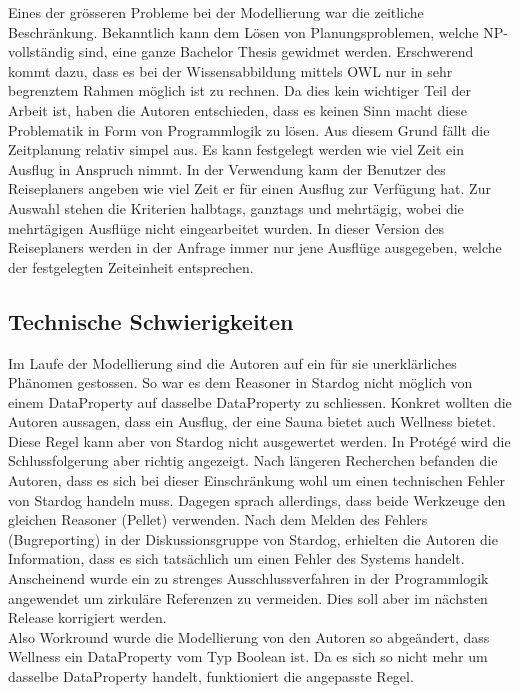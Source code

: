 Eines der grösseren Probleme bei der Modellierung war die zeitliche Beschränkung. Bekanntlich kann dem Lösen von Planungsproblemen, welche NP-vollständig sind, eine ganze Bachelor Thesis gewidmet werden. Erschwerend kommt dazu, dass es bei der Wissensabbildung mittels OWL nur in sehr begrenztem Rahmen möglich ist zu rechnen. Da dies kein wichtiger Teil der Arbeit ist, haben die Autoren entschieden, dass es keinen Sinn macht diese Problematik in Form von Programmlogik zu lösen. Aus diesem Grund fällt die Zeitplanung relativ simpel aus. Es kann festgelegt werden wie viel Zeit ein Ausflug in Anspruch nimmt. In der Verwendung kann der Benutzer des Reiseplaners angeben wie viel Zeit er für einen Ausflug zur Verfügung hat. Zur Auswahl stehen die Kriterien halbtags, ganztags und mehrtägig, wobei die mehrtägigen Ausflüge nicht eingearbeitet wurden. In dieser Version des Reiseplaners werden in der Anfrage immer nur jene Ausflüge ausgegeben, welche der festgelegten Zeiteinheit entsprechen.

\subsection{Technische Schwierigkeiten}
\label{subsec:loesung_modellierung_technischeSchwierigkeiten}
Im Laufe der Modellierung sind die Autoren auf ein für sie unerklärliches Phänomen gestossen. So war es dem Reasoner in Stardog nicht möglich von einem DataProperty auf dasselbe DataProperty zu schliessen. Konkret wollten die Autoren aussagen, dass ein Ausflug, der eine Sauna bietet auch Wellness bietet. Diese Regel kann aber von Stardog nicht ausgewertet werden. In Protégé wird die Schlussfolgerung aber richtig angezeigt. Nach längeren Recherchen befanden die Autoren, dass es sich bei dieser Einschränkung wohl um einen technischen Fehler von Stardog handeln muss. Dagegen sprach allerdings, dass beide Werkzeuge den gleichen Reasoner (Pellet) verwenden. Nach dem Melden des Fehlers (Bugreporting) in der Diskussionsgruppe von Stardog, erhielten die Autoren die Information, dass es sich tatsächlich um einen Fehler des Systems handelt. Anscheinend wurde ein zu strenges Ausschlussverfahren in der Programmlogik angewendet um zirkuläre Referenzen zu vermeiden. Dies soll aber im nächsten Release korrigiert werden. \\
Also Workround wurde die Modellierung von den Autoren so abgeändert, dass Wellness ein DataProperty vom Typ Boolean ist. Da es sich so nicht mehr um dasselbe DataProperty handelt, funktioniert die angepasste Regel.


